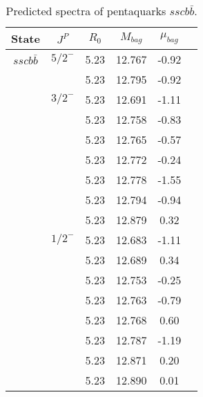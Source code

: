 \documentclass[prd,twocolumn,floatfix,nofootinbib]{revtex4}
\begin{document}
\begin{table*}[!htbp]
    \caption{Predicted spectra of pentaquarks $sscb\bar{b }$.}
    \begin{tabular}{cccccc}
        \hline\hline
        {\rm State} &$J^{P}$ &$R_{0}$ &$M_{bag}$ &$\mu_{bag}$  \\ \hline
        $sscb\bar{b}$
            &${5/2}^{-}$     &5.23   &12.767 &-0.92 \\ 
                         &$ $     &5.23   &12.795 &-0.92 \\                         
            &${3/2}^{-}$     &5.23   &12.691 &-1.11 \\
                         &$ $     &5.23   &12.758 &-0.83  \\
                         &$ $     &5.23   &12.765 &-0.57  \\
                         &$ $     &5.23   &12.772 &-0.24 \\
                         &$ $     &5.23   &12.778 &-1.55  \\
                         &$ $     &5.23   &12.794 &-0.94  \\
                         &$ $     &5.23   &12.879 &0.32 \\                        
            &${1/2}^{-}$     &5.23   &12.683 &-1.11  \\
                         &$ $     &5.23   &12.689 &0.34  \\
                         &$ $     &5.23   &12.753 &-0.25  \\
                         &$ $     &5.23   &12.763 &-0.79 \\
                         &$ $     &5.23   &12.768 &0.60  \\
                         &$ $     &5.23   &12.787 &-1.19 \\
                         &$ $     &5.23   &12.871 &0.20 \\                         
                         &$ $     &5.23   &12.890 &0.01 \\                          
       \hline\hline
    \end{tabular}
\end{table*}
\end{document}
